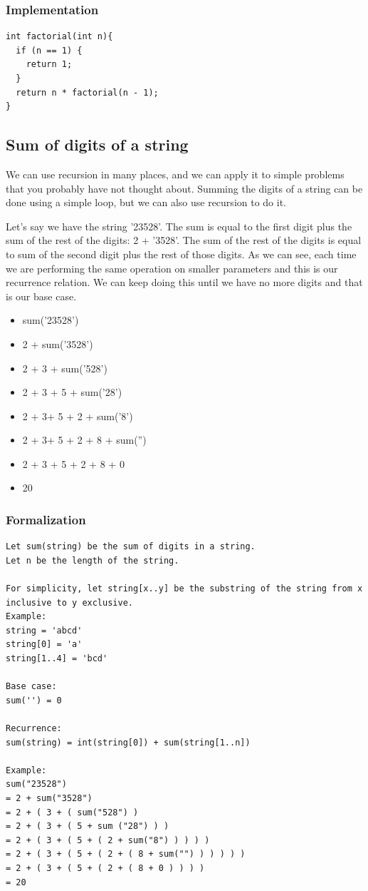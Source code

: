 \documentclass[11pt,oneside]{book}
\begin{document}
\subsubsection{Implementation}

\begin{lstlisting}
int factorial(int n){
  if (n == 1) {
    return 1;
  }
  return n * factorial(n - 1);
}
\end{lstlisting}

\subsection{Sum of digits of a string}

We can use recursion in many places, and we can apply it to simple problems that you probably have not thought about. Summing the digits of a string can be done using a simple loop, but we can also use recursion to do it.

Let's say we have the string '23528'. The sum is equal to the first digit plus the sum of the rest of the digits: 2 + '3528'. The sum of the rest of the digits is equal to sum of the second digit plus the rest of those digits. As we can see, each time we are performing the same operation on smaller parameters and this is our recurrence relation. We can keep doing this until we have no more digits and that is our base case.

\begin{itemize}
\item sum('23528')
\item 2 + sum('3528')
\item 2 + 3 + sum('528')
\item 2 + 3 + 5 + sum('28')
\item 2 + 3+ 5 + 2 + sum('8') 
\item 2 + 3+ 5 + 2 + 8 + sum('')
\item 2 + 3 + 5 + 2 + 8 + 0
\item 20
\end{itemize}

\subsubsection{Formalization}

\begin{lstlisting}
Let sum(string) be the sum of digits in a string.
Let n be the length of the string.

For simplicity, let string[x..y] be the substring of the string from x inclusive to y exclusive.
Example: 
string = 'abcd'
string[0] = 'a'
string[1..4] = 'bcd'

Base case:
sum('') = 0

Recurrence:
sum(string) = int(string[0]) + sum(string[1..n])

Example:
sum("23528")
= 2 + sum("3528")
= 2 + ( 3 + ( sum("528") )
= 2 + ( 3 + ( 5 + sum ("28") ) )
= 2 + ( 3 + ( 5 + ( 2 + sum("8") ) ) ) )
= 2 + ( 3 + ( 5 + ( 2 + ( 8 + sum("") ) ) ) ) )
= 2 + ( 3 + ( 5 + ( 2 + ( 8 + 0 ) ) ) )
= 20
\end{lstlisting}
\end{document}
